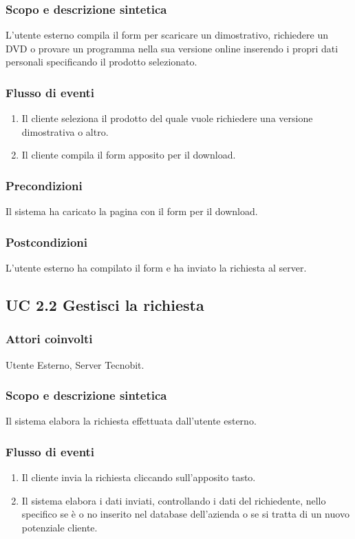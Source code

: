 \subsubsection*{Scopo e descrizione sintetica}
L'utente esterno compila il form per scaricare un dimostrativo, richiedere un DVD o provare un programma nella sua versione online inserendo i propri dati personali specificando il prodotto selezionato.
\subsubsection*{Flusso di eventi}
\begin{enumerate}
\item Il cliente seleziona il prodotto del quale vuole richiedere una versione dimostrativa o altro.
\item Il cliente compila il form apposito per il download.
\end{enumerate}
\subsubsection*{Precondizioni} Il sistema ha caricato la pagina con il form per il download.
\subsubsection*{Postcondizioni} L'utente esterno ha compilato il form e ha inviato la richiesta al server.

\subsection*{UC 2.2 Gestisci la richiesta}
\subsubsection*{Attori coinvolti} Utente Esterno, Server Tecnobit.
\subsubsection*{Scopo e descrizione sintetica}
Il sistema elabora la richiesta effettuata dall'utente esterno.
\subsubsection*{Flusso di eventi}
\begin{enumerate}
\item Il cliente invia la richiesta cliccando sull'apposito tasto.
\item Il sistema elabora i dati inviati, controllando i dati del richiedente, nello specifico se \`e o no inserito nel database dell'azienda o se si tratta di un nuovo potenziale cliente.
\end{enumerate}
